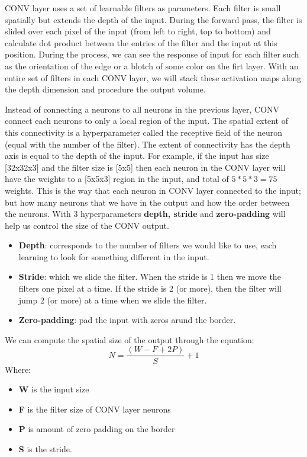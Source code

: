 CONV layer uses a set of learnable filters as parameters. Each filter is small spatially but extends the depth of the input. During the forward pass, the filter is slided over each pixel of the input (from left to right, top to bottom) and calculate dot product between the entries of the filter and the input at this position. During the process, we can see the response of input for each filter such as the orientation of the edge or a blotch of some color on the firt layer. With an entire set of filters in each CONV layer, we will stack these activation maps along the depth dimension and procedure the output volume.

Instead of connecting a neurons to all neurons in the previous layer, CONV connect each neurons to only a local region of the input. The spatial extent of this connectivity is a hyperparameter called the receptive field of the neuron (equal with the number of the filter). The extent of connectivity has the depth axis is equal to the depth of the input. For example, if the input has size [32x32x3] and the filter size is [5x5] then each neuron in the CONV layer will have the weights to a [5x5x3] region in the input, and total of $5*5*3 = 75$ weights. This is the way that each neuron in CONV layer connected to the input; but how many neurons that we have in the output and how the order between the neurons. With 3 hyperparameters \textbf{depth, stride} and \textbf{zero-padding} will help us control the size of the CONV output.
\begin{itemize}
	\item \textbf{Depth}: corresponds to the number of filters we would like to use, each learning to look for something different in the input.
	\item \textbf{Stride}:  which we slide the filter. When the stride is 	1 then we move the filters one pixel at a time. If the stride is 2 (or more), then the filter will jump 2 (or more) at a time when we slide the filter.
	\item \textbf{Zero-padding}: pad the input with zeros arund the border.
\end{itemize}
We can compute the spatial size of the output through the equation:
\begin{equation}
	N = \frac{(W - F + 2P)}{S} + 1
	\label{convneuron}
\end{equation}
Where:
\begin{itemize}
	\item \textbf{W} is the input size
	\item \textbf{F} is the filter size of CONV layer neurons
	\item \textbf{P} is amount of zero padding on the border
	\item \textbf{S} is the stride.
\end{itemize}

